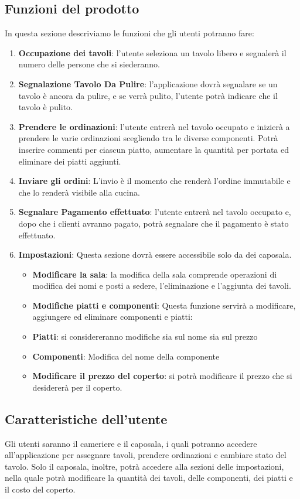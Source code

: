 \documentclass[12pt, letterpaper]{book}
\begin{document}
\subsection{Funzioni del prodotto}
In questa sezione descriviamo le funzioni che gli utenti potranno fare:
\begin{enumerate}


    \item \textbf{Occupazione dei tavoli}: l'utente seleziona un tavolo libero e segnalerà il numero delle persone che si siederanno.
    \item \textbf{Segnalazione Tavolo Da Pulire}: l'applicazione dovrà segnalare se un tavolo è ancora da pulire, e se verrà pulito, l'utente potrà indicare che il tavolo è pulito.
    \item \textbf{Prendere le ordinazioni}: l'utente entrerà nel tavolo occupato e inizierà a prendere le varie ordinazioni scegliendo tra le diverse componenti. Potrà inserire commenti per ciascun piatto, aumentare la quantità per portata ed eliminare dei piatti aggiunti.
    \item \textbf{Inviare gli ordini}: L'invio è il momento che renderà l'ordine immutabile e che lo renderà visibile alla cucina.
    \item \textbf{Segnalare Pagamento effettuato}: l'utente entrerà nel tavolo occupato e, dopo che i clienti avranno pagato, potrà segnalare che il pagamento è stato effettuato.
    \item \textbf{Impostazioni}: Questa sezione dovrà essere accessibile solo da dei caposala.
          \begin{itemize}
              \item \textbf{Modificare la sala}: la modifica della sala comprende operazioni di modifica dei nomi e posti a sedere, l'eliminazione e l'aggiunta dei tavoli.
              \item \textbf{Modifiche piatti e componenti}: Questa funzione servirà a modificare, aggiungere ed eliminare componenti e piatti:
              \item \textbf{Piatti}: si considereranno modifiche sia sul nome sia sul prezzo
              \item \textbf{Componenti}: Modifica del nome della componente
              \item \textbf{Modificare il prezzo del coperto}: si potrà modificare il prezzo che si desidererà per il coperto.
          \end{itemize}
\end{enumerate}
\subsection{Caratteristiche dell'utente}
Gli utenti saranno il cameriere e il caposala, i quali potranno accedere all'applicazione per assegnare tavoli, prendere ordinazioni e cambiare stato del tavolo. Solo il caposala, inoltre, potrà accedere alla sezioni delle impostazioni, nella quale potrà modificare la quantità dei tavoli, delle componenti, dei piatti e il costo del coperto.
\end{document}
